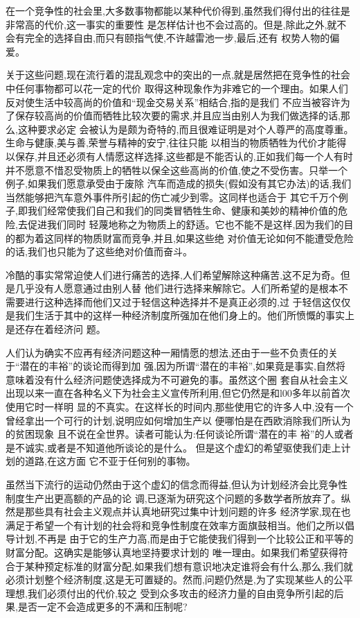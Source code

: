 ﻿\documentclass[12pt]{article}
\begin{document}
在一个竞争性的社会里,大多数事物都能以某种代价得到,虽然我们得付出的往往是非常高的代价,这一事实的重要性
是怎样估计也不会过高的。但是,除此之外,就不会有完全的选择自由,而只有颐指气使,不许越雷池一步,最后,还有
权势人物的偏爱。

关于这些问题,现在流行着的混乱观念中的突出的一点,就是居然把在竞争性的社会中任何事物都可以花一定的代价
取得这种现象作为非难它的一个理由。如果人们反对使生活中较高尚的价值和``现金交易关系''相结合,指的是我们
不应当被容许为了保存较高尚的价值而牺牲比较次要的需求,并且应当由别人为我们做选择的话,那么,这种要求必定
会被认为是颇为奇特的,而且很难证明是对个人尊严的高度尊重。生命与健康,美与善,荣誉与精神的安宁,往往只能
以相当的物质牺牲为代价才能得以保存,并且还必须有人情愿这样选择,这些都是不能否认的,正如我们每一个人有时
并不愿意不惜忍受物质上的牺牲以保全这些高尚的价值,使之不受伤害。只举一个例子,如果我们愿意承受由于废除
汽车而造成的损失(假如没有其它办法)的话,我们当然能够把汽车意外事件所引起的伤亡减少到零。这同样也适合于
其它千万个例子,即我们经常使我们自己和我们的同类冒牺牲生命、健康和美妙的精神价值的危险,去促进我们同时
轻蔑地称之为物质上的舒适。它也不能不是这样,因为我们的目的都为着这同样的物质财富而竞争,并且,如果这些绝
对价值无论如何不能遭受危险的话,我们也只能为了这些绝对价值而奋斗。

冷酷的事实常常迫使人们进行痛苦的选择,人们希望解除这种痛苦,这不足为奇。但是几乎没有人愿意通过由别人替
他们进行选择来解除它。人们所希望的是根本不需要进行这种选择而他们又过于轻信这种选择并不是真正必须的,过
于轻信这仅仅是我们生活于其中的这样一种经济制度所强加在他们身上的。他们所愤慨的事实上是还存在着经济问
题。

人们认为确实不应再有经济问题这种一厢情愿的想法,还由于一些不负责任的关于``潜在的丰裕''的谈论而得到加
强,因为所谓``潜在的丰裕'',如果竟是事实,自然将意味着没有什么经济问题使选择成为不可避免的事。虽然这个圈
套自从社会主义出现以来一直在各种名义下为社会主义宣传所利用,但它仍然是和l00多年以前首次使用它时一样明
显的不真实。在这样长的时间内,那些使用它的许多人中,没有一个曾经拿出一个可行的计划,说明应如何增加生产以
便哪怕是在西欧消除我们所认为的贫困现象 \myrule 且不说在全世界。读者可能认为:任何谈论所谓``潜在的丰
裕''的人或者是不诚实,或者是不知道他所谈论的是什么。 但是这个虚幻的希望驱使我们走上计划的道路,在这方面
它不亚于任何别的事物。

虽然当下流行的运动仍然由于这个虚幻的信念而得益,但认为计划经济会比竞争性制度生产出更高额的产品的论
调,已逐渐为研究这个问题的多数学者所放弃了。纵然是那些具有社会主义观点并认真地研究过集中计划问题的许多
经济学家,现在也满足于希望一个有计划的社会将和竞争性制度在效率方面旗鼓相当。他们之所以倡导计划,不再是
由于它的生产力高,而是由于它能使我们得到一个比较公正和平等的财富分配。这确实是能够认真地坚持要求计划的
唯一理由。如果我们希望获得符合于某种预定标准的财富分配,如果我们想有意识地决定谁将会有什么,那么,我们就
必须计划整个经济制度,这是无可置疑的。然而,问题仍然是,为了实现某些人的公平理想,我们必须付出的代价,较之
受到众多攻击的经济力量的自由竞争所引起的后果,是否一定不会造成更多的不满和压制呢?
\end{document}
